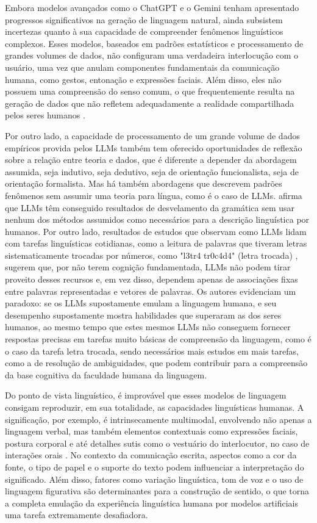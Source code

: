 Embora modelos avançados como o ChatGPT e o Gemini tenham apresentado progressos significativos na geração de linguagem natural, ainda subsistem incertezas quanto à sua capacidade de compreender fenômenos linguísticos complexos. Esses modelos, baseados em padrões estatísticos e processamento de grandes volumes de dados, não configuram uma verdadeira interlocução com o usuário, uma vez que anulam componentes fundamentais da comunicação humana, como gestos, entonação e expressões faciais. Além disso, eles não possuem uma compreensão do senso comum, o que frequentemente resulta na geração de dados que não refletem adequadamente a realidade compartilhada pelos seres humanos \cite{itankar2020ambiguity,singh2015role,chaplot2015unsupervised,agirre1997proposal}.

Por outro lado, a capacidade de processamento de um grande volume de dados empíricos provida pelos LLMs também tem oferecido oportunidades de reflexão sobre a relação entre teoria e dados, que é diferente a depender da abordagem assumida, seja indutivo, seja dedutivo, seja de orientação funcionalista, seja de orientação formalista. Mas há também abordagens que descrevem padrões fenômenos sem assumir uma teoria para língua, como é o caso de LLMs. \textcite{piantadosi2023modern} afirma que LLMs têm conseguido resultados de desvelamento da gramática sem usar nenhum dos métodos assumidos como necessários para a descrição linguística por humanos. Por outro lado, resultados de estudos que observam como LLMs lidam com tarefas linguísticas cotidianas, como a leitura de palavras que tiveram letras sistematicamente trocadas por números, como "l3tr4 tr0c4d4" (letra trocada) \cite{marcus2023sentence}, sugerem que, por não terem cognição fundamentada, LLMs não podem tirar proveito desses recursos e, em vez disso, dependem apenas de associações fixas entre palavras representadas e vetores de palavras. Os autores evidenciam um paradoxo: se os LLMs supostamente emulam a linguagem humana, e seu desempenho supostamente mostra habilidades que superaram as dos seres humanos, ao mesmo tempo que estes mesmos LLMs não conseguem fornecer respostas precisas em tarefas muito básicas de compreensão da linguagem, como é o caso da tarefa letra trocada, sendo necessários mais estudos em mais tarefas, como a de resolução de ambiguidades, que podem contribuir para a compreensão da base cognitiva da faculdade humana da linguagem. 

Do ponto de vista linguístico, é improvável que esses modelos de linguagem consigam reproduzir, em sua totalidade, as capacidades linguísticas humanas. A significação, por exemplo, é intrinsecamente multimodal, envolvendo não apenas a linguagem verbal, mas também elementos contextuais como expressões faciais, postura corporal e até detalhes sutis como o vestuário do interlocutor, no caso de interações orais \cite{freitag2022linguistic}. No contexto da comunicação escrita, aspectos como a cor da fonte, o tipo de papel e o suporte do texto podem influenciar a interpretação do significado. Além disso, fatores como variação linguística, tom de voz e o uso de linguagem figurativa são determinantes para a construção de sentido, o que torna a completa emulação da experiência linguística humana por modelos artificiais uma tarefa extremamente desafiadora. 

